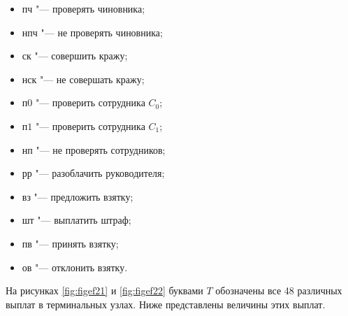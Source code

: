 \begin{itemize}
	\item $\text{пч}$ "--- проверять чиновника;
	\item $\text{нпч}$ "--- не проверять чиновника;
	\item $\text{ск}$ "--- совершить кражу;
	\item $\text{нск}$ "--- не совершать кражу;
	\item $\text{п0}$ "--- проверить сотрудника $C_0$;
	\item $\text{п1}$ "--- проверить сотрудника $C_1$;
	\item $\text{нп}$ "--- не проверять сотрудников;
	\item $\text{рр}$ "--- разоблачить руководителя;
	\item $\text{вз}$ "--- предложить взятку;
	\item $\text{шт}$ "--- выплатить штраф;
	\item $\text{пв}$ "--- принять взятку;
	\item $\text{ов}$ "--- отклонить взятку.
\end{itemize}
\par
На рисунках \ref{fig:figef21} и \ref{fig:figef22} буквами $T$ обозначены все 48 различных выплат в терминальных узлах. Ниже представлены величины этих выплат.
\par
